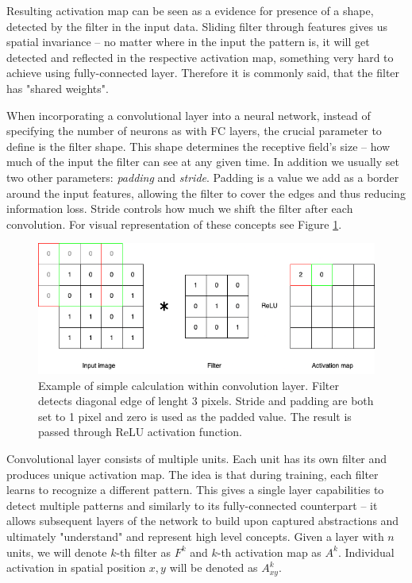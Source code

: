 Resulting activation map can be seen as a evidence for presence of a shape, detected by the filter in the input data. Sliding filter through features gives us spatial invariance -- no matter where in the input the pattern is, it will get detected and reflected in the respective activation map, something very hard to achieve using fully-connected layer.
Therefore it is commonly said, that the filter has "shared weights".

When incorporating a convolutional layer into a neural network, instead of specifying the number of neurons as with FC layers, the crucial parameter to define is the filter shape.
This shape determines the receptive field's size -- how much of the input the filter can see at any given time.
In addition we usually set two other parameters: \emph{padding} and \emph{stride}.
Padding is a value we add as a border around the input features, allowing the filter to cover the edges and thus reducing information loss.
Stride controls how much we shift the filter after each convolution.
For visual representation of these concepts see Figure \ref{fig:cnn-convolution}.


\begin{figure}
    \begin{center}
    \begin{minipage}{0.75\textwidth}
      \includegraphics[width=\textwidth]{img/cnn-conv.png}
    \end{minipage}
    \caption{Example of simple calculation within convolution layer. Filter detects diagonal edge of lenght 3 pixels. Stride and padding are both set to 1 pixel and zero is used as the padded value. The result is passed through ReLU activation function.}
    \label{fig:cnn-convolution}
    \end{center}
\end{figure}

Convolutional layer consists of multiple units.
Each unit has its own filter and produces unique activation map.
The idea is that during training, each filter learns to recognize a different pattern.
This gives a single layer capabilities to detect multiple patterns and similarly to its fully-connected counterpart -- it allows subsequent layers of the network to build upon captured abstractions and ultimately "understand" and represent high level concepts.
Given a layer with $n$ units, we will denote $k$-th filter as $F^k$ and $k$-th activation map as $A^k$.
Individual activation in spatial position $x, y$ will be denoted as $A^k_{xy}$.

